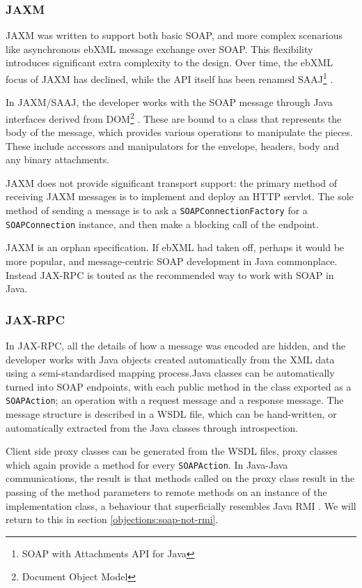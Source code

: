 \subsubsection{JAXM}
\label{intro:jaxm}

JAXM was written to support both basic SOAP, and more complex
scenarious like asynchronous ebXML message exchange over SOAP. This
flexibility introduces significant extra complexity to the design.
Over time, the ebXML focus of JAXM has declined, while the API itself
has been renamed SAAJ\footnote{SOAP with Attachments API for Java}
\cite{spec:SAAJ-12}.

In JAXM/SAAJ, the developer works with the SOAP message through Java
interfaces derived from DOM\footnote{Document Object Model}
\cite{spec:DOM}. These are bound to a class that represents the body
of the message, which provides various operations to manipulate the
pieces. These include accessors and manipulators for the envelope,
headers, body and any binary attachments.

JAXM does not provide significant transport support: the primary
method of receiving JAXM messages is to implement and deploy an HTTP
servlet.  The sole method of sending a message is to ask a
\verb|SOAPConnectionFactory| for a \verb|SOAPConnection| instance, and
then make a blocking call of the endpoint.

JAXM is an orphan specification. If ebXML had taken off, perhaps it
would be more popular, and message-centric SOAP development in Java
commonplace. Instead JAX-RPC is touted as the recommended way to work
with SOAP in Java. 

\subsubsection{JAX-RPC}
\label{intro:jax-rpc}

In JAX-RPC, all the details of how a message was encoded are hidden,
and the developer works with Java objects created automatically from
the XML data using a semi-standardised mapping process.Java classes
can be automatically turned into SOAP endpoints, with each public
method in the class exported as a {\tt SOAPAction}; an operation with
a request message and a response message. The message structure is
described in a WSDL file, which can be hand-written, or automatically
extracted from the Java classes through introspection. 

Client side proxy classes can be generated from the WSDL files, proxy
classes which again provide a method for every {\tt SOAPAction}. In
Java-Java communications, the result is that methods called on the
proxy class result in the passing of the method parameters to remote
methods on an instance of the implementation class, a behaviour that
superficially resembles Java RMI \cite{paper:RMI}. We will return to
this in section \ref{objections:soap-not-rmi}.

